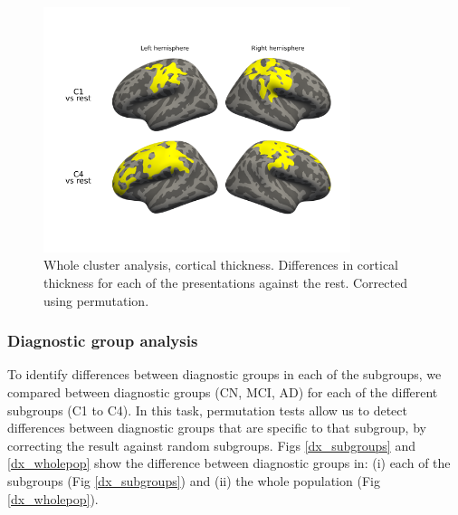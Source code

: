 \begin{figure}[!htbp]
\centering
\includegraphics[width=0.8\textwidth]{figures/cimlr/ex1_cort.png}
\caption[Whole cluster analysis, cortical thickness.]{Whole cluster analysis, cortical thickness. Differences in cortical thickness for each of the presentations against the rest. Corrected using permutation.}
\label{cluster_against_others_cort}
\end{figure}

\subsubsection{Diagnostic group analysis}

To identify differences between diagnostic groups in each of the subgroups, we compared between diagnostic groups (CN, MCI, AD) for each of the different subgroups (C1 to C4). In this task, permutation tests allow us to detect differences between diagnostic groups that are specific to that subgroup, by correcting the result against random subgroups. Figs \ref{dx_subgroups} and \ref{dx_wholepop} show the difference between diagnostic groups in: (i) each of the subgroups (Fig \ref{dx_subgroups}) and (ii) the whole population (Fig \ref{dx_wholepop}). \\

